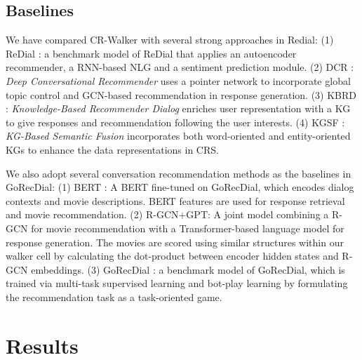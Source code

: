 \documentclass[11pt]{article}
\begin{document}
\subsection{Baselines}
We have compared CR-Walker with several strong approaches in Redial:
    (1) ReDial \cite{li2018towards}: a benchmark model of ReDial that applies an autoencoder recommender, a RNN-based NLG and a sentiment prediction module.
    (2) DCR \cite{liao2019deep}: \textit{Deep Conversational Recommender} uses a pointer network to incorporate global topic control and GCN-based recommendation in response generation.
    (3) KBRD \cite{chen2019towards}: \textit{Knowledge-Based Recommender Dialog} enriches user representation with a KG to give responses and recommendation following the user interests.
(4) KGSF \cite{zhou2020improving}: \textit{KG-Based Semantic Fusion} incorporates both word-oriented and entity-oriented KGs to enhance the data representations in CRS.

We also adopt several conversation recommendation methods as the baselines in GoRecDial:
    (1) BERT \cite{devlin2019bert}: A BERT fine-tuned on GoRecDial, which encodes dialog contexts and movie descriptions. BERT features are used for response retrieval and movie recommendation.
    (2) R-GCN+GPT: A joint model combining a R-GCN \cite{schlichtkrull2018modeling} for movie recommendation with a Transformer-based language model \cite{vaswani2017attention} for response generation. The movies are scored using similar structures within our walker cell by calculating the dot-product between encoder hidden states and R-GCN embeddings.
    (3) GoRecDial \cite{kang2019recommendation}: a benchmark model of GoRecDial, which is trained via multi-task supervised learning and bot-play learning by formulating the recommendation task as a task-oriented game.

\section{Results}
\end{document}
